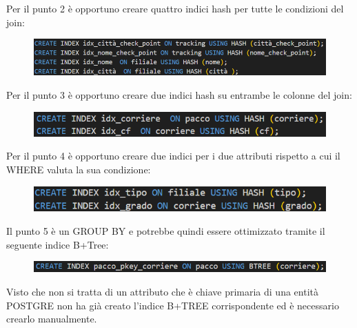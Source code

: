 \noindent Per il punto 2 è opportuno creare quattro indici hash per tutte le condizioni del join:
\begin{figure}[H]
\centering
\includegraphics[width=0.8 \textwidth]{Resources/INDEX2.png}
\label{I2}
\end{figure}

\noindent Per il punto 3 è opportuno creare due indici hash su entrambe le colonne del join:

\begin{figure}[H]
\centering
\includegraphics[width=0.8 \textwidth]{Resources/INDEX3.png}
\label{I3}
\end{figure}

\noindent Per il punto 4 è opportuno creare due indici per i due attributi rispetto a cui il WHERE valuta la sua condizione:

\begin{figure}[H]
\centering
\includegraphics[width=1 \textwidth]{Resources/INDEX4.png}
\label{I4}
\end{figure}

\noindent Il punto 5 è un GROUP BY e potrebbe quindi essere ottimizzato tramite il seguente indice B+Tree:
 
\begin{figure}[H]
\centering
\includegraphics[width=1 \textwidth]{Resources/INDEX5.png}
\label{I5}
\end{figure}  

\noindent Visto che non si tratta di un attributo che è chiave primaria di una entità POSTGRE non ha già creato l'indice B+TREE corrispondente ed è necessario crearlo manualmente.
